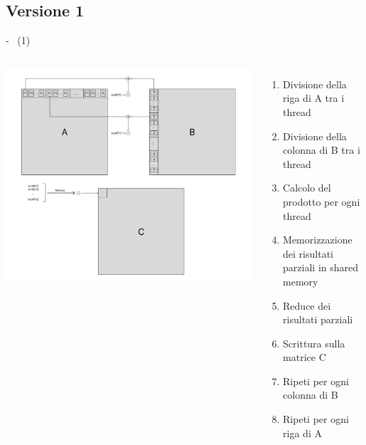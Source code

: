 \documentclass[compress]{beamer}
\begin{document}
\subsection{Versione 1}
\begin{frame}{\secname \text{ }- \subsecname\ (1)}
    \begin{columns}
            \begin{minipage}{1\textwidth}
                \begin{adjustbox}{margin=0cm 0cm 0cm 0cm, center} %
                    \includegraphics[width=1.2\textwidth]{resources/cuda_scheme_v1.png}
                \end{adjustbox}
            \end{minipage}
            \begin{minipage}[b]{1\textwidth}
                \begin{enumerate}
                    \item Divisione della riga di A tra i thread
                    \item Divisione della colonna di B tra i thread
                    \item Calcolo del prodotto per ogni thread
                    \item Memorizzazione dei risultati parziali in shared memory
                    \item Reduce dei risultati parziali
                    \item Scrittura sulla matrice C
                    \item Ripeti per ogni colonna di B
                    \item Ripeti per ogni riga di A
                \end{enumerate}
            \end{minipage}
    \end{columns}
\end{frame}
\end{document}
